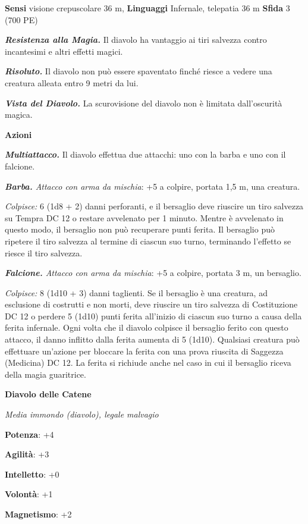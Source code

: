 \begin{multicols}{2}
\textbf{Sensi} visione crepuscolare 36 m, 
\textbf{Linguaggi} Infernale, telepatia 36 m \textbf{Sfida} 3 (700 PE)

\emph{\textbf{Resistenza alla Magia.}} Il diavolo ha vantaggio ai tiri
salvezza contro incantesimi e altri effetti magici.

\emph{\textbf{Risoluto.}} Il diavolo non può essere spaventato finché
riesce a vedere una creatura alleata entro 9 metri da lui.

\emph{\textbf{Vista del Diavolo.}} La scurovisione del diavolo non è
limitata dall'oscurità magica.

\textbf{Azioni}

\emph{\textbf{Multiattacco.}} Il diavolo effettua due attacchi: uno con
la barba e uno con il falcione.

\emph{\textbf{Barba.} Attacco con arma da mischia}: +5 a colpire,
portata 1,5 m, una creatura.

\emph{Colpisce:} 6 (1d8 + 2) danni perforanti, e il bersaglio deve
riuscire un tiro salvezza su Tempra DC 12 o restare avvelenato per
1 minuto. Mentre è avvelenato in questo modo, il bersaglio non può
recuperare punti ferita. Il bersaglio può ripetere il tiro salvezza al
termine di ciascun suo turno, terminando l'effetto se riesce il tiro
salvezza.

\emph{\textbf{Falcione.} Attacco con arma da mischia}: +5 a colpire,
portata 3 m, un bersaglio.

\emph{Colpisce:} 8 (1d10 + 3) danni taglienti. Se il bersaglio è una
creatura, ad esclusione di costrutti e non morti, deve riuscire un tiro
salvezza di Costituzione DC 12 o perdere 5 (1d10) punti ferita
all'inizio di ciascun suo turno a causa della ferita infernale. Ogni
volta che il diavolo colpisce il bersaglio ferito con questo attacco, il
danno inflitto dalla ferita aumenta di 5 (1d10). Qualsiasi creatura può
effettuare un'azione per bloccare la ferita con una prova riuscita di
Saggezza (Medicina) DC 12. La ferita si richiude anche nel caso in cui
il bersaglio riceva della magia guaritrice.



\textbf{Diavolo delle Catene}

\emph{Media immondo (diavolo), legale malvagio}

\textbf{Potenza}: +4

\textbf{Agilità}: +3

\textbf{Intelletto}: +0

\textbf{Volontà}: +1

\textbf{Magnetismo}: +2


\end{multicols}
